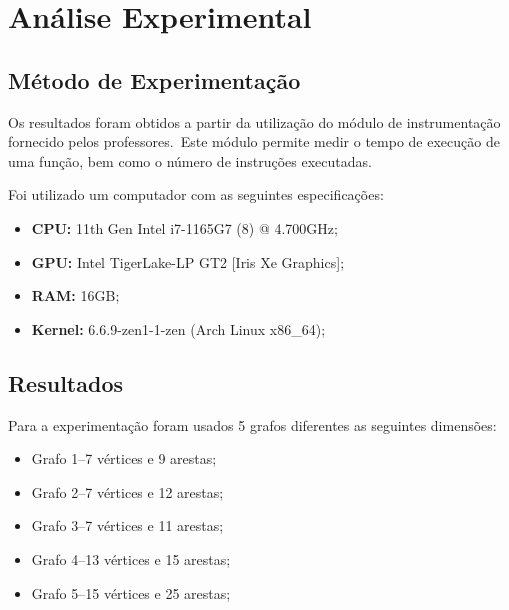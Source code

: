\chapter{Análise Experimental}
\label{ch:analise-experimental}

\section{Método de Experimentação}
\label{sec:analise-experimental:metodo-de-experimentacao}

Os resultados foram obtidos a partir da utilização do módulo de instrumentação fornecido pelos professores.\ Este módulo permite medir o tempo de execução de uma função, bem como o número de instruções executadas.

Foi utilizado um computador com as seguintes especificações:

\begin{itemize}
    \item \textbf{CPU:} 11th Gen Intel i7-1165G7 (8) @ 4.700GHz;
    \item \textbf{GPU:} Intel TigerLake-LP GT2 [Iris Xe Graphics];
    \item \textbf{RAM:} 16GB;
    \item \textbf{Kernel:} 6.6.9-zen1-1-zen (Arch Linux x86\_64);
\end{itemize}

\section{Resultados}
\label{sec:analise-experimental:resultados}

Para a experimentação foram usados 5 grafos diferentes as seguintes dimensões:

\begin{itemize}
    \item Grafo 1--7 vértices e 9 arestas;
    \item Grafo 2--7 vértices e 12 arestas;
    \item Grafo 3--7 vértices e 11 arestas;
    \item Grafo 4--13 vértices e 15 arestas;
    \item Grafo 5--15 vértices e 25 arestas;
\end{itemize}

